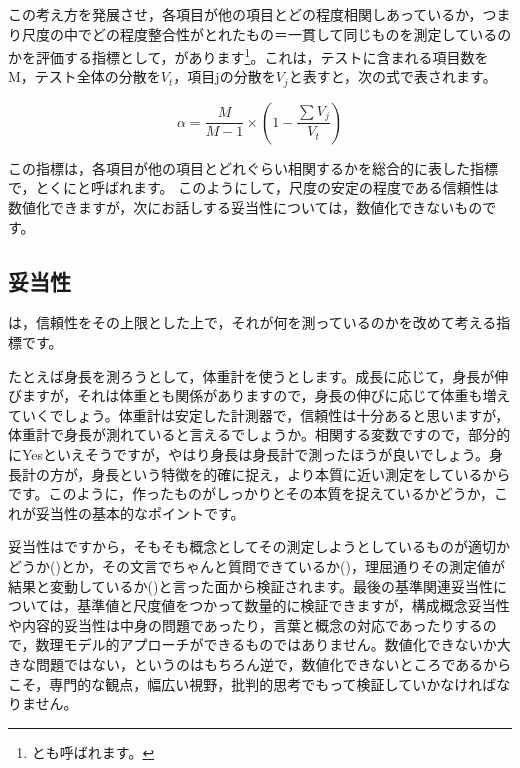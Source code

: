 \documentclass{ltjsbook}
\begin{document}
この考え方を発展させ，各項目が他の項目とどの程度相関しあっているか，つまり尺度の中でどの程度整合性がとれたもの＝一貫して同じものを測定しているのかを評価する指標として，があります\footnote{とも呼ばれます。}。これは，テストに含まれる項目数をM，テスト全体の分散を$V_t$，項目jの分散を$V_j$と表すと，次の式で表されます。

\[  \alpha =   \frac{M}{M-1} \times \left(1-\frac{\sum V_j}{V_t} \right) \]

この指標は，各項目が他の項目とどれぐらい相関するかを総合的に表した指標で，とくにと呼ばれます。
このようにして，尺度の安定の程度である信頼性は数値化できますが，次にお話しする妥当性については，数値化できないものです。
\subsection{妥当性}
は，信頼性をその上限とした上で，それが何を測っているのかを改めて考える指標です。

たとえば身長を測ろうとして，体重計を使うとします。成長に応じて，身長が伸びますが，それは体重とも関係がありますので，身長の伸びに応じて体重も増えていくでしょう。体重計は安定した計測器で，信頼性は十分あると思いますが，体重計で身長が測れていると言えるでしょうか。相関する変数ですので，部分的にYesといえそうですが，やはり身長は身長計で測ったほうが良いでしょう。身長計の方が，身長という特徴を的確に捉え，より本質に近い測定をしているからです。このように，作ったものがしっかりとその本質を捉えているかどうか，これが妥当性の基本的なポイントです。

妥当性はですから，そもそも概念としてその測定しようとしているものが適切かどうか()とか，その文言でちゃんと質問できているか()，理屈通りその測定値が結果と変動しているか()と言った面から検証されます。最後の基準関連妥当性については，基準値と尺度値をつかって数量的に検証できますが，構成概念妥当性や内容的妥当性は中身の問題であったり，言葉と概念の対応であったりするので，数理モデル的アプローチができるものではありません。数値化できないか大きな問題ではない，というのはもちろん逆で，数値化できないところであるからこそ，専門的な観点，幅広い視野，批判的思考でもって検証していかなければなりません。
\end{document}
